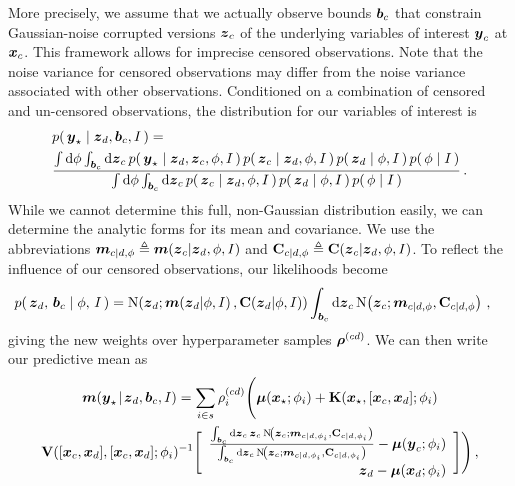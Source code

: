 \documentclass{acmtrans2m}
\begin{document}
More precisely, we assume that we actually observe bounds $\boldsymbol{b}_c$ that constrain Gaussian-noise corrupted versions $\boldsymbol{z}_c$ of the underlying variables of interest $\boldsymbol{y}_c$ at $\boldsymbol{x}_c$. This framework allows for imprecise censored observations. Note that the noise variance for censored observations may differ from the noise variance associated with other observations. Conditioned on a combination of censored and un-censored observations, the distribution for our variables of interest is
\begin{align*} %
& \p{\vyst}{\vzD,\vect{b}_c,I}=\nonumber\\
& \frac{\int\ud\phi\int_{\vect{b}_c}\ud\vz_c\, \p{\vyst}{\vzD,\vz_c,\phi,I}\p{\vz_c}{\vzD,\phi,I}\p{\vzD}{\phi,I}\p{\phi}{I}}
{\int\ud\phi\int_{\vect{b}_c}\ud\vz_c\, \p{\vz_c}{\vzD,\phi,I}\p{\vzD}{\phi,I}\p{\phi}{I}}\,.
\end{align*}
While we cannot determine this full, non-Gaussian distribution easily, we can determine the analytic forms for its mean and covariance. We use the abbreviations $\boldsymbol{m}_{c|d,\phi}\triangleq\boldsymbol{m}\!\left({\boldsymbol{z}}_{c}\middle\vert\boldsymbol{z}_d,\phi,I\right)$ and $\mathbf{C}_{c|d,\phi}\triangleq\mathbf{C}\!\left({\boldsymbol{z}}_{c}\middle\vert\boldsymbol{z}_d,\phi,I\right)$.
To reflect the influence of our censored observations, our likelihoods become
\begin{align*}
 p\!\left(\,\boldsymbol{z}_d,\,\boldsymbol{b}_c\mid\phi,\,I\,\right)
  &= \text{N}\!\left(\boldsymbol{z}_d;\boldsymbol{m}\!\left({\boldsymbol{z}}_{d}\middle\vert\phi,I\right),\mathbf{C}\!\left({\boldsymbol{z}}_{d}\middle\vert\phi,I\right)\right)\int_{\boldsymbol{b}_c}\mathrm{d}\boldsymbol{z}_c\,\text{N}\!\left(\boldsymbol{z}_c;\boldsymbol{m}_{c|d,\phi},\mathbf{C}_{c|d,\phi}\right)\,,
\end{align*}
giving the new weights over hyperparameter samples $\boldsymbol{\rho}^{(cd)}$.
We can then write our predictive mean as
\begin{multline*} %
\meansub{\vy}{\star}{\vzD,\vect{b}_c,I}=\sum_{i\in s}\rho^{(cd)}_i\Biggl(\vect{\mu}(\vxst;\phi_i)+\mat{K}(\vxst,[\vx_c,\vxD];\phi_i)\\\mat{V}([\vx_c,\vxD],[\vx_c,\vxD];\phi_i)^{-1}
\Biggl[\begin{array}{r}
	\frac{\int_{\vect{b}_c}\ud\vz_c\,\vz_c\, \N{\vz_c}{\vect{m}_{c|d,\phi_i}}{\mat{C}_{c|d,\phi_i}}}{\int_{\vect{b}_c}\ud\vz_c\,\N{\vz_c}{\vect{m}_{c|d,\phi_i}}{\mat{C}_{c|d,\phi_i}}}-\vect{\mu}(\vy_c;\phi_i)\\
       \vzD-\vect{\mu}(\vxD;\phi_i)
      \end{array}\Biggr]\Biggr)\,,
\end{multline*}
\end{document}
